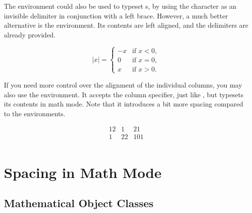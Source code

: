 The  environment could also be used to typeset s, by using the  character as an invisible 
delimiter in conjunction with a left brace. However, a much better alternative
is the  environment. Its contents are left aligned, and the delimiters
are already provided.
\begin{example}
\[
  \lvert x \rvert =
  \begin{cases}
    -x & \text{if } x < 0, \\
    0  & \text{if } x = 0, \\
    x  & \text{if } x > 0.
  \end{cases}
\]
\end{example}

If you need more control over the alignment of the individual columns, you may
also use the  environment. It accepts the column specifier, just like
, but typesets its contents in math mode. Note that it
introduces a bit more spacing compared to the  environments.
\begin{example}
\[
  \begin{array}{rcl}
    12 & 1 & 21 \\
    1 & 22 & 101 \\
  \end{array}
\]
\end{example}

\section{Spacing in Math Mode}\label{sec:math-spacing}%

\subsection{Mathematical Object Classes}

